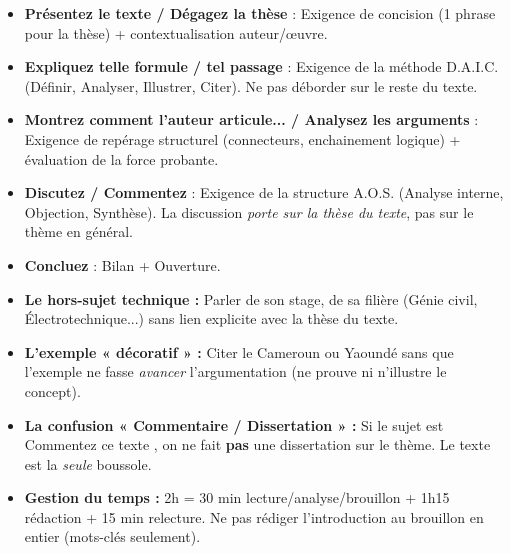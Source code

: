 \documentclass[11pt]{article}
\begin{document}
\begin{aretenir}
\begin{itemize}
\item \textbf{Présentez le texte / Dégagez la thèse} : Exigence de concision (1 phrase pour la thèse) + contextualisation auteur/œuvre.
\item \textbf{Expliquez telle formule / tel passage} : Exigence de la méthode D.A.I.C. (Définir, Analyser, Illustrer, Citer). Ne pas déborder sur le reste du texte.
\item \textbf{Montrez comment l'auteur articule... / Analysez les arguments} : Exigence de repérage structurel (connecteurs, enchainement logique) + évaluation de la force probante.
\item \textbf{Discutez / Commentez} : Exigence de la structure A.O.S. (Analyse interne, Objection, Synthèse). La discussion \emph{porte sur la thèse du texte}, pas sur le thème en général.
\item \textbf{Concluez} : Bilan + Ouverture.
\end{itemize}
\end{aretenir}

\begin{attention}
\begin{itemize}
\item \textbf{Le hors-sujet technique :} Parler de son stage, de sa filière (Génie civil, Électrotechnique...) sans lien explicite avec la thèse du texte.
\item \textbf{L'exemple « décoratif » :} Citer \og le Cameroun \fg ou \og Yaoundé \fg sans que l'exemple ne fasse \emph{avancer} l'argumentation (ne prouve ni n'illustre le concept).
\item \textbf{La confusion « Commentaire / Dissertation » :} Si le sujet est \og Commentez ce texte \fg, on ne fait \textbf{pas} une dissertation sur le thème. Le texte est la \emph{seule} boussole.
\item \textbf{Gestion du temps :} 2h = 30 min lecture/analyse/brouillon + 1h15 rédaction + 15 min relecture. Ne pas rédiger l'introduction au brouillon en entier (mots-clés seulement).
\end{itemize}
\end{attention}
\end{document}
